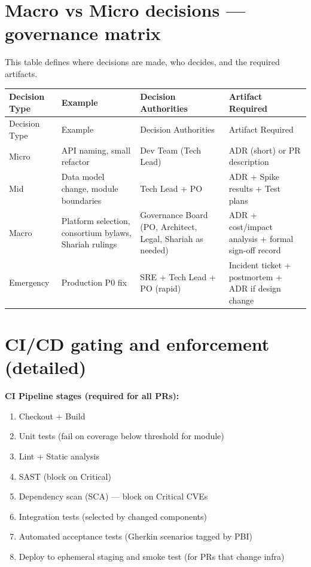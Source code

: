 \documentclass[11pt,a4paper]{article}
\begin{document}
\section{Macro vs Micro decisions — governance matrix}
This table defines where decisions are made, who decides, and the required artifacts.

\begin{longtable}{p{} p{} p{} p{}}
\toprule
Decision Type & Example & Decision Authorities & Artifact Required \\
\midrule
\endfirsthead
\toprule
Decision Type & Example & Decision Authorities & Artifact Required \\
\midrule
\endhead
Micro & API naming, small refactor & Dev Team (Tech Lead) & ADR (short) or PR description \\
Mid & Data model change, module boundaries & Tech Lead + PO & ADR + Spike results + Test plans \\
Macro & Platform selection, consortium bylaws, Shariah rulings & Governance Board (PO, Architect, Legal, Shariah as needed) & ADR + cost/impact analysis + formal sign-off record \\
Emergency & Production P0 fix & SRE + Tech Lead + PO (rapid) & Incident ticket + postmortem + ADR if design change \\
\bottomrule
\end{longtable}

\section{CI/CD gating and enforcement (detailed)}
\textbf{CI Pipeline stages (required for all PRs):}
\begin{enumerate}[leftmargin=*]
  \item Checkout + Build
  \item Unit tests (fail on coverage below threshold for module)
  \item Lint + Static analysis
  \item SAST (block on Critical)
  \item Dependency scan (SCA) — block on Critical CVEs
  \item Integration tests (selected by changed components)
  \item Automated acceptance tests (Gherkin scenarios tagged by PBI)
  \item Deploy to ephemeral staging and smoke test (for PRs that change infra)
\end{enumerate}
\end{document}
